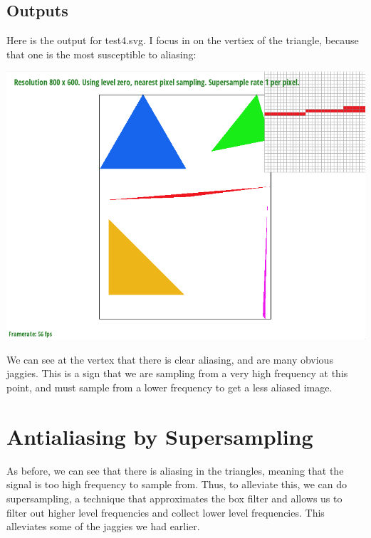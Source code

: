 \documentclass{article}
\begin{document}
\subsection{Outputs}
Here is the output for test4.svg. I focus in on the vertiex of the triangle, because that one is the most susceptible to aliasing:
\begin{center}
    \includegraphics[]{Task 1/output.png}
\end{center}
We can see at the vertex that there is clear aliasing, and are many obvious jaggies. This is a sign that we are sampling from a very high frequency at this point, and must sample from a lower frequency to get a less aliased image.
\section{Antialiasing by Supersampling}
As before, we can see that there is aliasing in the triangles, meaning that the signal is too high frequency to sample from. Thus, to alleviate this, we can do supersampling, a technique that approximates the box filter and allows us to filter out higher level frequencies and collect lower level frequencies. This alleviates some of the jaggies we had earlier.
\end{document}
